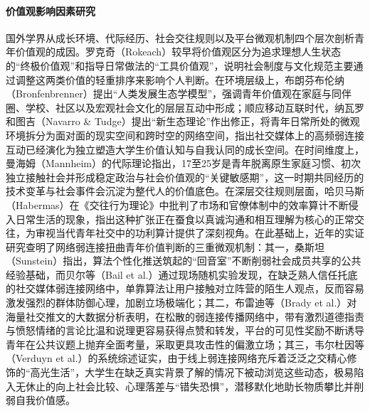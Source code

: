 \paragraph{价值观影响因素研究}
国外学界从成长环境、代际经历、社会交往规则以及平台微观机制四个层次剖析青年价值观的成因。罗克奇（Rokeach）较早将价值观区分为追求理想人生状态的“终极价值观”和指导日常做法的“工具价值观”，说明社会制度与文化规范主要通过调整这两类价值的轻重排序来影响个人判断\cite{Rokeach1973}。在环境层级上，布朗芬布伦纳（Bronfenbrenner）提出“人类发展生态学模型”，强调青年价值观在家庭与同伴圈、学校、社区以及宏观社会文化的层层互动中形成\cite{Bronfenbrenner1979}；顺应移动互联时代，纳瓦罗和图吉（Navarro \& Tudge）提出“新生态理论”作出修正，将青年日常所处的微观环境拆分为面对面的现实空间和跨时空的网络空间，指出社交媒体上的高频弱连接互动已经演化为独立塑造大学生价值认知与自我认同的成长空间\cite{Navarro2023}。在时间维度上，曼海姆（Mannheim）的代际理论指出，17至25岁是青年脱离原生家庭习惯、初次独立接触社会并形成稳定政治与社会价值观的“关键敏感期”，这一时期共同经历的技术变革与社会事件会沉淀为整代人的价值底色\cite{Mannheim1952}。在深层交往规则层面，哈贝马斯（Habermas）在《交往行为理论》中批判了市场和官僚体制中的效率算计不断侵入日常生活的现象，指出这种扩张正在蚕食以真诚沟通和相互理解为核心的正常交往，为审视当代青年社交中的功利算计提供了深刻视角\cite{Habermas2004}。在此基础上，近年的实证研究查明了网络弱连接扭曲青年价值判断的三重微观机制：其一，桑斯坦（Sunstein）指出，算法个性化推送筑起的“回音室”不断削弱社会成员共享的公共经验基础\cite{Sunstein2017}，而贝尔等（Bail et al.）通过现场随机实验发现，在缺乏熟人信任托底的社交媒体弱连接网络中，单靠算法让用户接触对立阵营的陌生人观点，反而容易激发强烈的群体防御心理，加剧立场极端化\cite{Bail2018}；其二，布雷迪等（Brady et al.）对海量社交推文的大数据分析表明，在松散的弱连接传播网络中，带有激烈道德指责与愤怒情绪的言论比温和说理更容易获得点赞和转发，平台的可见性奖励不断诱导青年在公共议题上抛弃全面考量，采取更具攻击性的偏激立场\cite{Brady2021}；其三，韦尔杜因等（Verduyn et al.）的系统综述证实，由于线上弱连接网络充斥着泛泛之交精心修饰的“高光生活”，大学生在缺乏真实背景了解的情况下被动浏览这些动态，极易陷入无休止的向上社会比较、心理落差与“错失恐惧”，潜移默化地助长物质攀比并削弱自我价值感\cite{Verduyn2020}。

